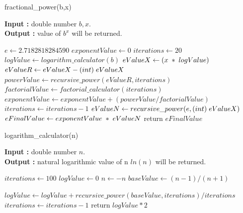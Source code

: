 \documentclass[12pt, a4paper]{article}
\begin{document}
\newpage
\begin{algorithm}[hbt!]
	\renewcommand{\thealgorithm}{2.2}
	\caption{fractional\_power(b,x)}\label{alg:two}
	
	\hspace*{\algorithmicindent} \textbf{Input : }double number $b,x$. \\
	\hspace*{\algorithmicindent} \textbf{Output : }value of $b^x$ will be returned.
	\begin{algorithmic}[1]
		\STATE $e \gets 2.7182818284590$
		\STATE $exponentValue \gets 0$
		\STATE $iterations \gets 20$
		\STATE $logValue \gets logarithm\_calculator(b)$
		\STATE $eValueX \gets (x \hspace{1mm} * \hspace{1mm} logValue)$
		\STATE $eValueR \gets eValueX - (int)\hspace{1mm}eValueX$
		\STATE $powerValue \gets recursive\_power(eValueR , iterations) $
		\STATE $factorialValue \gets factorial\_calculator(iterations)$ 
		\STATE $exponentValue \gets exponentValue + (powerValue / factorialValue)$
		\STATE $iterations \gets iterations - 1$
		\ENDWHILE
		\STATE $eValueN \gets recursive\_power(e, (int) \hspace{1mm} eValueX)$
		\STATE $eFinalValue \gets exponentValue \hspace{1mm}*\hspace{1mm} eValueN$
		\STATE return $eFinalValue$
	\end{algorithmic}
\end{algorithm}
\vspace*{-.4cm}
\begin{algorithm}[hbt!]
	\renewcommand{\thealgorithm}{2.3}
	\caption{logarithm\_calculator(n)}\label{alg:two}
	
	\hspace*{\algorithmicindent} \textbf{Input : }double number $n$. \\
	\hspace*{\algorithmicindent} \textbf{Output : }natural logarithmic value of n $ln(n)$ will be returned.
	\begin{algorithmic}[1]
		
		\STATE $iterations \gets 100$
		\STATE $logValue \gets 0 $
		\STATE $n \gets -n$
		\ENDIF
		\STATE $baseValue \gets (n - 1) / (n + 1) $
		
		\STATE $logValue \gets logValue + recursive\_power(baseValue , iterations) / iterations $
		\ENDIF
		\STATE $iterations \gets iterations - 1$
		\ENDWHILE
		\STATE return $logValue * 2$
		
	\end{algorithmic}
\end{algorithm}
\end{document}
